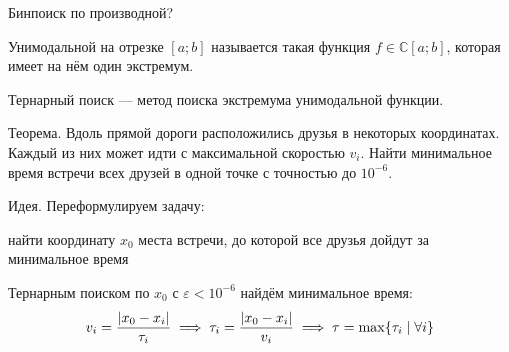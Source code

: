 {\bold Бинпоиск по производной?}

{\bold Унимодальной} на отрезке $[a;b]$ называется такая функция $f\in\mathbb{C}[a;b]$, которая имеет на нём {\ital один экстремум}.

{\bold Тернарный поиск} --- метод поиска экстремума унимодальной функции.

\begin{theorem}
{\bold Теорема.} Вдоль прямой дороги расположились друзья в некоторых координатах. Каждый из них может идти с максимальной скоростью $v_i$. Найти минимальное время встречи всех друзей в одной точке с точностью до $10^{-6}$.
\end{theorem}

{\bold Идея.} Переформулируем задачу:
\begin{list*}
\item найти координату $x_0$ места встречи, до которой все друзья дойдут за минимальное время
\end{list*}

Тернарным поиском по $x_0$ с $\varepsilon\less 10^{-6}$ найдём минимальное время:
$$v_i=\frac{\left|x_0-x_i\right|}{\tau_i}\implies\tau_i=\frac{\left|x_0-x_i\right|}{v_i}\implies\tau=\max\{\tau_i\mid\forall i\}$$
